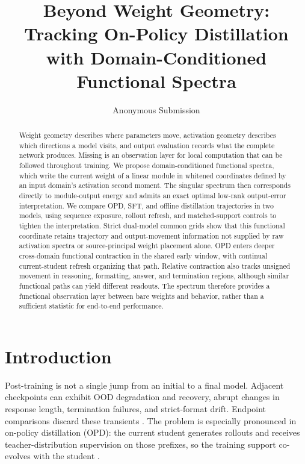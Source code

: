 \documentclass[letterpaper]{article} %
\title{Beyond Weight Geometry: Tracking On-Policy Distillation with Domain-Conditioned Functional Spectra}
\author{Anonymous Submission}
\begin{document}
\maketitle

\begin{abstract}
Weight geometry describes where parameters move, activation geometry describes which directions a model visits, and output evaluation records what the complete network produces. Missing is an observation layer for local computation that can be followed throughout training. We propose domain-conditioned functional spectra, which write the current weight of a linear module in whitened coordinates defined by an input domain's activation second moment. The singular spectrum then corresponds directly to module-output energy and admits an exact optimal low-rank output-error interpretation. We compare OPD, SFT, and offline distillation trajectories in two models, using sequence exposure, rollout refresh, and matched-support controls to tighten the interpretation. Strict dual-model common grids show that this functional coordinate retains trajectory and output-movement information not supplied by raw activation spectra or source-principal weight placement alone. OPD enters deeper cross-domain functional contraction in the shared early window, with continual current-student refresh organizing that path. Relative contraction also tracks unsigned movement in reasoning, formatting, answer, and termination regions, although similar functional paths can yield different readouts. The spectrum therefore provides a functional observation layer between bare weights and behavior, rather than a sufficient statistic for end-to-end performance.
\end{abstract}

\section{Introduction}

Post-training is not a single jump from an initial to a final model. Adjacent checkpoints can exhibit OOD degradation and recovery, abrupt changes in response length, termination failures, and strict-format drift. Endpoint comparisons discard these transients \citep{ren2026rethinking,jin2025rlheals}. The problem is especially pronounced in on-policy distillation (OPD): the current student generates rollouts and receives teacher-distribution supervision on those prefixes, so the training support co-evolves with the student \citep{agarwal2024opd,li2026rethinkingopd}.
\end{document}
